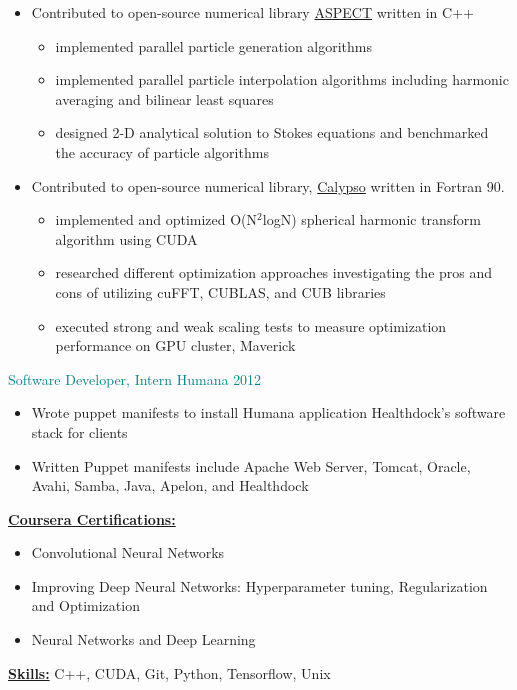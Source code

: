 \documentclass[11pt]{ltxdoc}
\begin{document}
      \begin{itemize}
      	
        \item Contributed to open-source numerical library \href{https://github.com/geodynamics/aspect}{ASPECT} written in C++
        
            \begin{itemize}        
            	\item implemented parallel particle generation algorithms
            	\item implemented parallel particle interpolation algorithms including harmonic averaging and bilinear least squares
            	\item designed 2-D analytical solution to Stokes equations and benchmarked the accuracy of particle algorithms
			\end{itemize}
      
		\item Contributed to open-source numerical library,
		\href{https://geodynamics.org/cig/software/calypso/}{Calypso} written in Fortran 90.
  
         	\begin{itemize}
          		\item implemented and optimized O(N$^2$logN) spherical harmonic transform algorithm using CUDA
          		\item researched different optimization approaches investigating the pros and cons of utilizing cuFFT, CUBLAS, and CUB libraries
          		\item executed strong and weak scaling tests to measure optimization performance on GPU cluster, Maverick
          	\end{itemize}
            
	\end{itemize}
    
	\textcolor{teal}{Software Developer, Intern} \hfill \textcolor{teal}{Humana} \hfill \textcolor{teal}{2012}
		
		\begin{itemize}
			\item Wrote puppet manifests to install Humana application Healthdock's software stack for clients
			\item Written Puppet manifests include Apache Web Server, Tomcat, Oracle, Avahi, Samba, Java, Apelon, and Healthdock
		\end{itemize}

\textbf{\underline{Coursera Certifications:}}
	\begin{itemize}
	  \item Convolutional Neural Networks
	  \item Improving Deep Neural Networks: Hyperparameter tuning, Regularization and Optimization
	  \item Neural Networks and Deep Learning
	\end{itemize}
        
\textbf{\underline{Skills:}} C++, CUDA, Git, Python, Tensorflow, Unix \\
\end{document}
